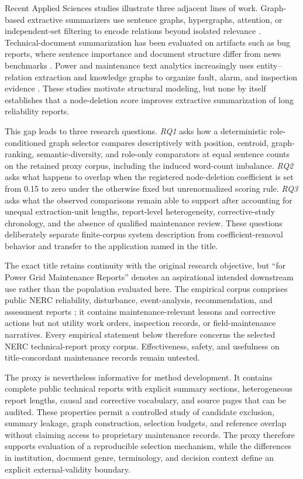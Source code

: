 \documentclass[applsci,article,submit,moreauthors]{Definitions/mdpi}
\begin{document}
Recent Applied Sciences studies illustrate three adjacent lines of work. Graph-based extractive summarizers use sentence graphs, hypergraphs, attention, or independent-set filtering to encode relations beyond isolated relevance \cite{siragusa2022sentencegraph,onan2024mches,hark2025mis}. Technical-document summarization has been evaluated on artifacts such as bug reports, where sentence importance and document structure differ from news benchmarks \cite{koh2022bugreport}. Power and maintenance text analytics increasingly uses entity--relation extraction and knowledge graphs to organize fault, alarm, and inspection evidence \cite{liu2022powerfault,ma2025alarm,zgg2026bridge}. These studies motivate structural modeling, but none by itself establishes that a node-deletion score improves extractive summarization of long reliability reports.

This gap leads to three research questions. \textit{RQ1} asks how a deterministic role-conditioned graph selector compares descriptively with position, centroid, graph-ranking, semantic-diversity, and role-only comparators at equal sentence counts on the retained proxy corpus, including the induced word-count imbalance. \textit{RQ2} asks what happens to overlap when the registered node-deletion coefficient is set from 0.15 to zero under the otherwise fixed but unrenormalized scoring rule. \textit{RQ3} asks what the observed comparisons remain able to support after accounting for unequal extraction-unit lengths, report-level heterogeneity, corrective-study chronology, and the absence of qualified maintenance review. These questions deliberately separate finite-corpus system description from coefficient-removal behavior and transfer to the application named in the title.

The exact title retains continuity with the original research objective, but ``for Power Grid Maintenance Reports'' denotes an aspirational intended downstream use rather than the population evaluated here. The empirical corpus comprises public NERC reliability, disturbance, event-analysis, recommendation, and assessment reports \cite{nercEventAnalysis,nerc2015qualityreport}; it contains maintenance-relevant lessons and corrective actions but not utility work orders, inspection records, or field-maintenance narratives. Every empirical statement below therefore concerns the selected NERC technical-report proxy corpus. Effectiveness, safety, and usefulness on title-concordant maintenance records remain untested.

The proxy is nevertheless informative for method development. It contains complete public technical reports with explicit summary sections, heterogeneous report lengths, causal and corrective vocabulary, and source pages that can be audited. These properties permit a controlled study of candidate exclusion, summary leakage, graph construction, selection budgets, and reference overlap without claiming access to proprietary maintenance records. The proxy therefore supports evaluation of a reproducible selection mechanism, while the differences in institution, document genre, terminology, and decision context define an explicit external-validity boundary.
\end{document}
